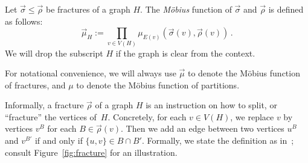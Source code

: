 \documentclass[authorcolumns,numberwithinsect]{no-lipics-v2022}
\begin{document}
\begin{definition}
    Let $\vec{\sigma} \leq \vec{\rho}$ be fractures of a graph $H$. The \emph{M\"obius} function of $\vec{\sigma}$ and $\vec{\rho}$ is defined as follows: 
    \[\vec{\mu}_H := \prod_{v\in V(H)} \mu_{E(v)}(\vec{\sigma}(v),\vec{\rho}(v))\,.\]
    We will drop the subscript $H$ if the graph is clear from the context.
\end{definition}

For notational convenience, we will always use $\vec{\mu}$ to denote the M\"obius function of fractures, and $\mu$ to denote the M\"obius function of partitions.

Informally, a fracture $\vec{\rho}$ of a graph $H$ is an instruction on how to split, or ``fracture'' the vertices of~$H$. Concretely, for each $v\in V(H)$, we replace $v$ by vertices $v^B$ for each $B \in \vec{\rho}(v)$. Then we add an edge between two vertices $u^B$ and $v^{B'}$ if and only if $\{u,v\}\in B \cap B'$. Formally, we state the definition as in~\cite{PeyerimhoffRSSVW23}; consult Figure~\ref{fig:fracture} for an illustration.
\end{document}
